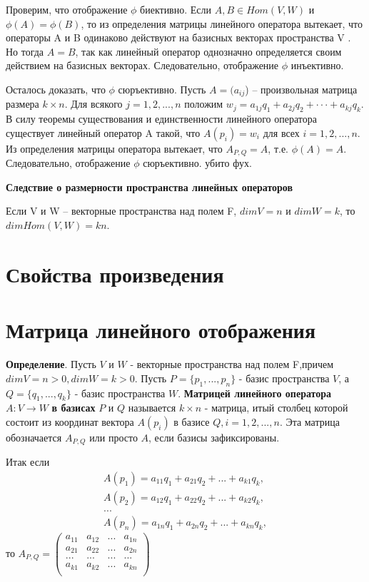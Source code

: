 \documentclass[a4paper]{article}
\begin{document}
Проверим, что отображение $\phi$ биективно. Если $A, B \in Hom(V, W)$ и
$\phi(A) = \phi(B)$, то из определения матрицы линейного оператора вытекает,
что операторы A и B одинаково действуют на базисных векторах
пространства V . Но тогда $A = B$, так как линейный оператор однозначно
определяется своим действием на базисных векторах. Следовательно,
отображение $\phi$ инъективно.

Осталось доказать, что $\phi$ сюръективно. Пусть $A = (a_{ij}$) – произвольная
матрица размера $k \times n$. Для всякого $j = 1, 2, . . . , n$ положим
$w_j = a_{1j}q_1 + a_{2j}q_2 + · · · + a_{kj}q_k$. В силу теоремы существования и
единственности линейного оператора существует линейный оператор A
такой, что $A(p_i) = w_i$ для всех $i = 1, 2, . . . , n$. Из определения матрицы
оператора вытекает, что $A_{P,Q} = A$, т.е. $\phi(A) = A$. Следовательно, отображение $\phi$ сюръективно. убито фух.

\textbf{Следствие о размерности пространства линейных операторов}

Если V и W – векторные пространства над полем F, $dim V = n$ и
$dim W = k$, то $dim Hom(V, W) = kn$.

\section*{Свойства произведения}
\section*{Матрица линейного отображения}

\textbf{Определение}. Пусть $V$ и $W$ - векторные  пространства над полем F,\newline причем $dim V = n>0, dim W = k > 0$. Пусть $P = \{ p_1, ..., p_n \}$ - базис пространства $V$, а $Q = \{ q_1, ..., q_k \}$ - базис пространства $W$. \textbf{Матрицей линейного оператора } $A: V \rightarrow W$ \textbf{в базисах} $P$ и $Q$ называется $k \times n$ - матрица, итый столбец  которой состоит из координат вектора $A(p_i)$ в базисе $Q, i = 1, 2, ..., n$. Эта матрица обозначается $A_{P,Q}$ или просто $A$, если базисы зафиксированы.

Итак если \begin{equation}
\begin{matrix}
A(p_1) = a_{11}q_1 + a_{21}q_2 + ... + a_{k1}q_k,\\
A(p_2) = a_{12}q_1 + a_{22}q_2 + ... + a_{k2}q_k,\\
...\\
A(p_n) = a_{1n}q_1 + a_{2n}q_2 + ... + a_{kn}q_k,
\end{matrix}
\end{equation}
то $\displaystyle A_{P,Q} = \begin{pmatrix}
	a_{11}& a_{12}& ...& a_{1n}\\
	a_{21}& a_{22}& ...& a_{2n}\\
	...& ...& ...& ...\\
	a_{k1}& a_{k2}& ...& a_{kn}\\
\end{pmatrix}$
 
\end{document}
